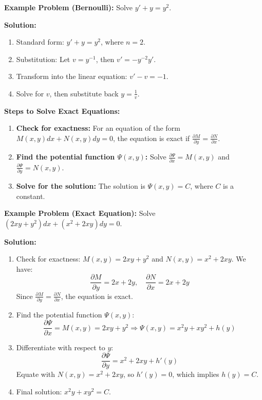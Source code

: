 \documentclass[10pt]{article}
\begin{document}
\textbf{Example Problem (Bernoulli):} Solve \( y' + y = y^2 \).

\textbf{Solution:}
\begin{enumerate}
    \item Standard form: \( y' + y = y^2 \), where \( n = 2 \).
    \item Substitution: Let \( v = y^{-1} \), then \( v' = -y^{-2} y' \).
    \item Transform into the linear equation: \( v' - v = -1 \).
    \item Solve for \( v \), then substitute back \( y = \frac{1}{v} \).
\end{enumerate}

\textbf{Steps to Solve Exact Equations:}
\begin{enumerate}
    \item \textbf{Check for exactness:} For an equation of the form \( M(x, y)dx + N(x, y)dy = 0 \), the equation is exact if \( \frac{\partial M}{\partial y} = \frac{\partial N}{\partial x} \).
    \item \textbf{Find the potential function \( \Psi(x, y) \):} Solve \( \frac{\partial \Psi}{\partial x} = M(x, y) \) and \( \frac{\partial \Psi}{\partial y} = N(x, y) \).
    \item \textbf{Solve for the solution:} The solution is \( \Psi(x, y) = C \), where \( C \) is a constant.
\end{enumerate}

\textbf{Example Problem (Exact Equation):} Solve \( (2xy + y^2) dx + (x^2 + 2xy) dy = 0 \).

\textbf{Solution:}
\begin{enumerate}
    \item Check for exactness: \( M(x, y) = 2xy + y^2 \) and \( N(x, y) = x^2 + 2xy \). We have:
    \[
    \frac{\partial M}{\partial y} = 2x + 2y, \quad \frac{\partial N}{\partial x} = 2x + 2y
    \]
    Since \( \frac{\partial M}{\partial y} = \frac{\partial N}{\partial x} \), the equation is exact.
    \item Find the potential function \( \Psi(x, y) \):
    \[
    \frac{\partial \Psi}{\partial x} = M(x, y) = 2xy + y^2 \Rightarrow \Psi(x, y) = x^2 y + xy^2 + h(y)
    \]
    \item Differentiate with respect to \( y \):
    \[
    \frac{\partial \Psi}{\partial y} = x^2 + 2xy + h'(y)
    \]
    Equate with \( N(x, y) = x^2 + 2xy \), so \( h'(y) = 0 \), which implies \( h(y) = C \).
    \item Final solution: \( x^2 y + xy^2 = C \).
\end{enumerate}
\end{document}

